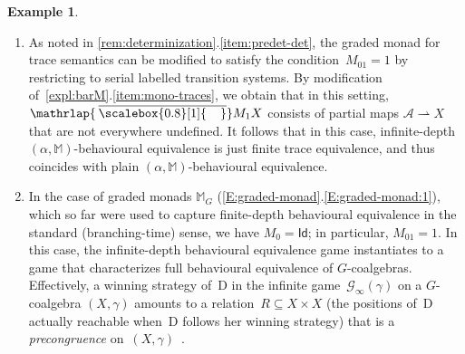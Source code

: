 \documentclass[sigconf,
			final%
			nonacm
                        ]{acmart}
\numberwithin{equation}{section}
\numberwithin{equation}{section}
\theoremstyle{plain}
\theoremstyle{definition}
\newtheorem{expl}[thm]{Example}
\newcommand{\mybar}[3]{%
  \mathrlap{\hspace{#2}\overline{\scalebox{#1}[1]{\hphantom{\ensuremath{#3}}\vphantom{\rule{0pt}{5.5pt}}}}}\ensuremath{#3}
}
\newcommand{\barM}{\mybar{0.8}{2pt}{M}_1}
\newcommand{\M}{\mathbb{M}}                   %
\newcommand{\A}{\mathcal{A}}            %
\newcommand{\CalG}{\mathcal{G}}             %
\newcommand{\Id}{\mathsf{Id}}                 %
\begin{document}
\begin{expl}\label{expl:inf-depth}
  \begin{enumerate}
  \item\label{item:inf-trace} As noted in
    \cref{rem:determinization}.\ref{item:predet-det}, the graded
    monad for trace semantics can be modified to satisfy the
    condition~$M_01=1$ by restricting to serial labelled transition
    systems. 
    By modification of~\cref{expl:barM}.\ref{item:mono-traces}, we
    obtain that in this setting, $\barM X$ consists of partial maps
    $\A\rightharpoonup X$ that are not everywhere undefined. It
    follows that in this case, infinite-depth
    $(\alpha,\M)$-behavioural equivalence is just finite trace
    equivalence, and thus coincides with plain
    $(\alpha,\M)$-behavioural equivalence.
  \item In the case of graded monads $\M_G$
    (\cref{E:graded-monad}.\ref{E:graded-monad:1}), which so far
    were used to capture finite-depth behavioural equivalence in the
    standard (branching-time) sense, we have $M_0=\Id$; in particular,
    $M_01=1$. In this case, the infinite-depth behavioural equivalence
    game instantiates to a game that characterizes full behavioural
    equivalence of $G$-coalgebras. Effectively, a winning strategy
    of~D in the infinite game~$\CalG_\infty(\gamma)$ on a
    $G$-coalgebra $(X,\gamma)$ amounts to a
    relation~$R\subseteq X\times X$ (the positions of~D actually
    reachable when~D follows her winning strategy) that is a
    \emph{precongruence} on~$(X,\gamma)$~\cite{AczelMendler89}.
  \end{enumerate}
\end{expl}
\end{document}
